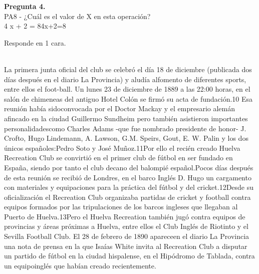 \documentclass[12pt,a4paper,twoside]{article}
\newlength{\espacioRestanteMain}
\newcommand{\freespaceBox}{
	
	\setlength{\espacioRestanteMain}{\dimexpr\textheight-\pagetotal-\baselineskip-15pt\relax}
	
	\ifthenelse{\lengthtest{\espacioRestanteMain > 3cm}}{
		\noindent
		\colorbox{gray!10}{
		  \begin{minipage}[t][\espacioRestanteMain][c]{0.98\textwidth}
			\begin{center}
			  \fontsize{14}{21}\selectfont
			  \textcolor{gray!80}
			  {
			  NO UTILIZAR ESTA PARTE DE LA HOJA.\\
			  CONTINÚA A PARTIR DE LA SIGUIENTE\\
			  PÁGINA.
			  }
			\end{center}
		  \end{minipage}
		}
	}{}
}
\begin{document}
                    \newpage
                    \null
                
                
                    \newpage
                    \null
                
        
            \noindent\textbf{Pregunta 4.} \\
                {
                    PA8 - ¿Cuál es el valor de X en esta operación?\\﻿4 x + 2 = 84x+2=8﻿\\
                }\par\noindent Responde en 1 cara.\\\\
                \freespaceBox
                    \newpage
                    \null
                
                
            
        {\noindent\begin{minipage}{\textwidth}
            {
                La primera junta oficial del club se celebró el día 18 de diciembre (publicada dos días después en el diario La Provincia) y aludía alfomento de diferentes sports, entre ellos el foot-ball. Un lunes 23 de diciembre de 1889 a las 22:00 horas, en el salón de chimeneas del antiguo Hotel Colón se firmó su acta de 
                fundación.10  Esa reunión había sidoconvocada por el Doctor Mackay y el empresario alemán afincado en la ciudad Guillermo Sundheim pero también asistieron importantes personalidadescomo Charles Adams -que fue nombrado presidente de honor- J. Crofto, Hugo Lindemann, A. Lawson, G.M. Speirs, Gout, E. W. Palin y los dos únicos españoles:Pedro Soto y José Muñoz.11​ Por ello el recién creado Huelva Recreation Club se convirtió en el primer club de fútbol en ser fundado en España, siendo por tanto el club decano del balompié español.Pocos días después de esta reunión se recibió de Londres, en el barco Inglés D. Hugo un cargamento con materiales y equipaciones para la práctica del fútbol y del cricket.12​Desde su oficialización el Recreation Club organizaba partidas de cricket y football contra equipos formados por las tripulaciones de los barcos ingleses que llegaban al Puerto de Huelva.13​Pero el Huelva Recreation también jugó contra equipos de provincias y áreas próximas a Huelva, entre ellos el Club Inglés de Riotinto y el Sevilla Football Club. El 28 de febrero de 1890 apareceen el diario La Provincia una nota de prensa en la que Isaías White invita al Recreation Club a disputar un partido de fútbol en la ciudad hispalense, en el Hipódromo de Tablada, contra un equipoinglés que habían creado recientemente.
            }
        \end{minipage}
        }
        \vspace{1\baselineskip}
\end{document}
